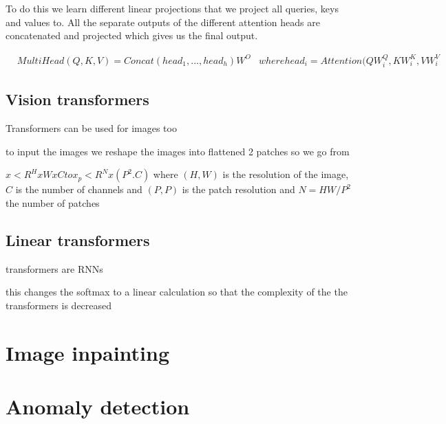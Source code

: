 To do this we learn different linear projections that we project all queries, keys and values to.  All the separate outputs of the different attention heads are concatenated and projected which gives us the final output.

\begin{align*}
&MultiHead(Q, K, V) = Concat(head_1, ..., head_h)W^O
& where head_i = Attention(QW_i^Q, KW_i^K, VW_i^V
\end{align*}


\subsection{Vision transformers}

\cite{dosovitskiy_image_2021}

Transformers can be used for images too

to input the images we reshape the images into flattened 2 patches
so we go from 

$x < R^HxWxC to x_p < R^N x (P^2.C)$ where $(H, W)$ is the resolution of the image, $C$ is the number of channels and $(P,P)$ is the patch resolution
and $N = HW/P^2$ the number of patches


\subsection{Linear transformers}

\cite{katharopoulos_transformers_2020}

transformers are RNNs

this changes the softmax to a linear calculation so that the complexity of the the transformers is decreased

\section{Image inpainting}
\label{sec:image-inpainting}

\section{Anomaly detection}
\label{sec:anomaly-detection}

